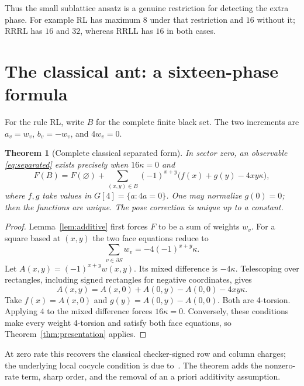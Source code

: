 \documentclass[11pt]{article}
\newtheorem{theorem}{Theorem}[section]
\theoremstyle{definition}
\begin{document}
Thus the small sublattice ansatz is a genuine restriction for detecting the
extra phase. For example RL has maximum $8$ under that restriction and $16$
without it; RRRL has $16$ and $32$, whereas RRLL has $16$ in both cases.

\section{The classical ant: a sixteen-phase formula}
For the rule RL, write $B$ for the complete finite black set. The two increments
are $a_v=w_v$, $b_v=-w_v$, and $4w_v=0$.

\begin{theorem}[Complete classical separated form]\label{thm:classical}
In sector zero, an observable \eqref{eq:separated} exists precisely when
$16\kappa=0$ and
\begin{equation}\label{eq:classicalform}
 F(B)=F(\varnothing)+\sum_{(x,y)\in B}
 (-1)^{x+y}\bigl(f(x)+g(y)-4xy\kappa\bigr),
\end{equation}
where $f,g$ take values in $G[4]=\{a:4a=0\}$. One may normalize $g(0)=0$;
then the functions are unique. The pose correction is unique up to a constant.
\end{theorem}
\begin{proof}
Lemma~\ref{lem:additive} first forces $F$ to be a sum of weights $w_v$.
For a square based at $(x,y)$ the two face equations reduce to
\[
 \sum_{v\in\partial S} w_v=-4(-1)^{x+y}\kappa.
\]
Let $A(x,y)=(-1)^{x+y}w(x,y)$. Its mixed difference is $-4\kappa$.
Telescoping over rectangles, including signed rectangles for negative
coordinates, gives
\[
 A(x,y)=A(x,0)+A(0,y)-A(0,0)-4xy\kappa.
\]
Take $f(x)=A(x,0)$ and $g(y)=A(0,y)-A(0,0)$. Both are 4-torsion. Applying
$4$ to the mixed difference forces $16\kappa=0$. Conversely, these conditions
make every weight 4-torsion and satisfy both face equations, so
Theorem~\ref{thm:presentation} applies.
\end{proof}

At zero rate this recovers the classical checker-signed row and column charges;
the underlying local cocycle condition is due to~\cite{jillhewar}. The theorem
adds the nonzero-rate term, sharp order, and the removal of an a priori
additivity assumption.
\end{document}
